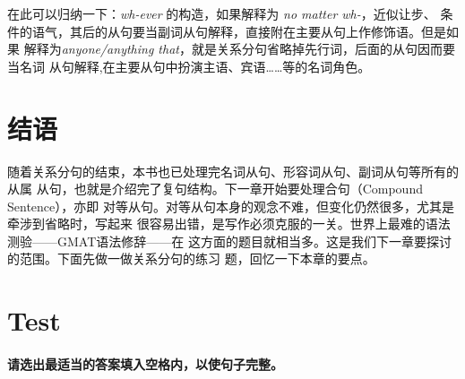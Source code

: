 在此可以归纳一下：\emph{wh-ever} 的构造，如果解释为 \emph{no matter wh-}，近似让步、
条件的语气，其后的从句要当副词从句解释，直接附在主要从句上作修饰语。但是如果
解释为\emph{anyone/anything that}，就是关系分句省略掉先行词，后面的从句因而要当名词
从句解释,在主要从句中扮演主语、宾语……等的名词角色。

\section{结语}

随着关系分句的结束，本书也已处理完名词从句、形容词从句、副词从句等所有的从属
从句，也就是介绍完了复句结构。下一章开始要处理合句（Compound Sentence），亦即
对等从句。对等从句本身的观念不难，但变化仍然很多，尤其是牵涉到省略时，写起来
很容易出错，是写作必须克服的一关。世界上最难的语法测验——GMAT语法修辞——在
这方面的题目就相当多。这是我们下一章要探讨的范围。下面先做一做关系分句的练习
题，回忆一下本章的要点。

\section{Test}

\paragraph{请选出最适当的答案填入空格内，以使句子完整。}

